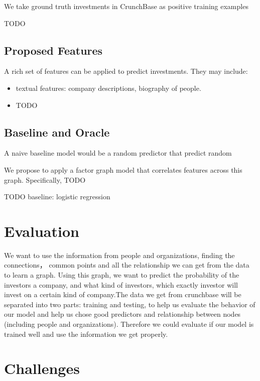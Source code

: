 We take ground truth investments in CrunchBase as positive training
examples

TODO

\subsection{Proposed Features}\label{proposed-features}

A rich set of features can be applied to predict investments. They may
include:

\begin{itemize}
\itemsep1pt\parskip0pt
\item
  textual features: company descriptions, biography of people.
\item
  TODO
\end{itemize}

\subsection{Baseline and Oracle}\label{baseline-and-oracle}

A naive baseline model would be a random predictor that predict random

We propose to apply a factor graph model that correlates features across
this graph. Specifically, TODO

TODO baseline: logistic regression

\section{Evaluation}\label{evaluation}

We want to use the information from people and organizations, finding
the connections， common points and all the relationship we can get from
the data to learn a graph. Using this graph, we want to predict the
probability of the investors a company, and what kind of investors,
which exactly investor will invest on a certain kind of company.The data
we get from crunchbase will be separated into two parts: training and
testing, to help us evaluate the behavior of our model and help us chose
good predictors and relationship between nodes (including people and
organizations). Therefore we could evaluate if our model is trained well
and use the information we get properly.

\section{Challenges}\label{challenges}

